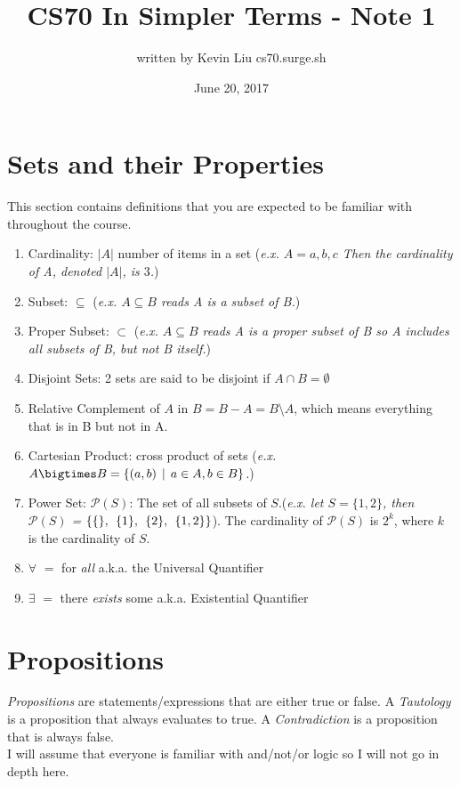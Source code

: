 \documentclass[a4paper]{article}
\title{CS70 In Simpler Terms - Note 1}
\author{written by Kevin Liu cs70.surge.sh}
\date{June 20, 2017}
\begin{document}
\maketitle

\section{Sets and their Properties}
This section contains definitions that you are expected to be familiar with throughout the course. 

\begin{enumerate}
	\item Cardinality: $|A|$ number of items in a set (\textit{e.x. $A = {a, b, c}$ Then the cardinality of A, denoted $|A|$, is $3$.})
	\item Subset: $\subseteq$ (\textit{e.x. $A \subseteq B$ reads A is a subset of B.})
	\item Proper Subset: $\subset$ (\textit{e.x. $A \subseteq B$ reads A is a proper subset of B so A includes all subsets of B, but not B itself.})
	\item Disjoint Sets: 2 sets are said to be disjoint if $A \cap B = \emptyset$
	\item Relative Complement of $A$ in $B = B - A = B$\textbackslash $A$, which means everything that is in B but not in A.
	\item Cartesian Product: cross product of sets (\textit{e.x. $A \bigtimes B = \{(a,b) \hspace{1ex}| \hspace{1ex} a\in A, b\in B\}$.}) 
	\item Power Set: $\mathscr{P}(S)$: The set of all subsets of $S$.(\textit{e.x. let $S = \{1,2\}$, then $\mathscr{P}(S)$ = $\{ \{\}, \hspace{1ex}\{1\}, \hspace{1ex}\{2\}, \hspace{1ex}\{1,2\}\}$}). The cardinality of $\mathscr{P}(S)$ is $2^k$, where $k$ is the cardinality of $S$.
	\item $\forall$ $=$ for \textit{all} a.k.a. the Universal Quantifier
	\item $\exists$ $=$ there \textit{exists} some a.k.a. Existential Quantifier
	
\end{enumerate}

\section{Propositions}
\textit{Propositions} are statements/expressions that are either true or false. A \textit{Tautology} is a proposition that always evaluates to true. A \textit{Contradiction} is a proposition that is always false.\\
I will assume that everyone is familiar with and/not/or logic so I will not go in depth here.
\end{document}
